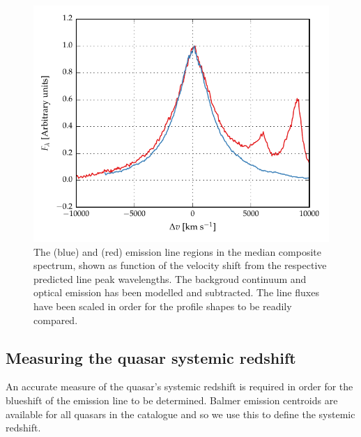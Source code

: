 \begin{figure}
    \centering 
    \includegraphics[width=0.8\linewidth]{figures/chapter03/ha_hb_composite.pdf} 
    \caption[{The \ha (blue) and \hb (red) emission line regions in the median composite spectrum, shown as function of the velocity shift from the respective predicted line peak wavelengths.}]{The \ha (blue) and \hb (red) emission line regions in the median composite spectrum, shown as function of the velocity shift from the respective predicted line peak wavelengths. The backgroud continuum and optical  emission has been modelled and subtracted. The line fluxes have been scaled in order for the profile shapes to be readily compared.}
    \label{fig:balmer_composite}
\end{figure}


\subsection{Measuring the quasar systemic redshift}
\label{sec:zsys}

An accurate measure of the quasar's systemic redshift is required in order for the blueshift of the  emission line to be determined.
Balmer emission centroids are available for all quasars in the catalogue and so we use this to define the systemic redshift.

